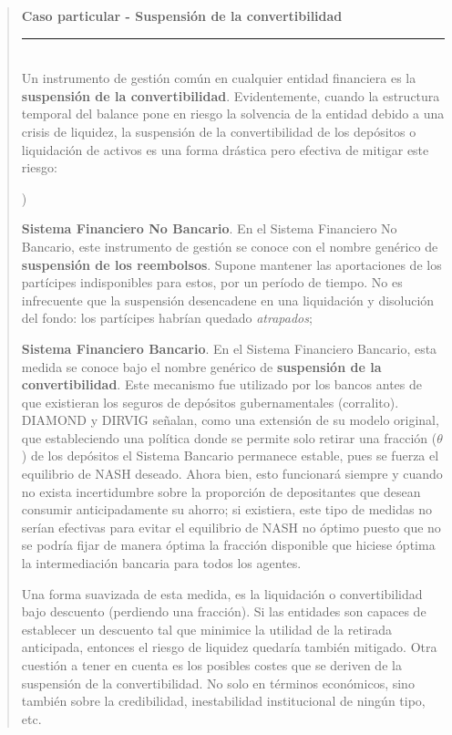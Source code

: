 \documentclass[10pt,a4paper]{article}
\newcounter{alphaitem}
\newenvironment{la}
      {\begin{list}{\alph{alphaitem})}{%
          \usecounter{alphaitem}%
          \setlength{\leftmargin}{1cm}%
          \setlength{\parskip}{3pt}%
          \setlength{\itemsep}{0pt}%
          \setlength{\parsep}{0pt}%
      }}
      {\end{list}}
\newenvironment{specialblock}[1]{%
      \begin{quote} %
      \small %
      \noindent\textbf{#1}\\[-0.3em] %
      \rule{\linewidth}{0.4pt}\\[0.6em]}{
      \end{quote}}
\begin{document}
\begin{specialblock}{Caso particular - Suspensión de la convertibilidad}
    Un instrumento de gestión común en cualquier entidad financiera es la \textbf{suspensión de la convertibilidad}. Evidentemente, cuando la estructura temporal del balance pone en riesgo la solvencia de la entidad debido a una crisis de liquidez, la suspensión de la convertibilidad de los depósitos o liquidación de activos es una forma drástica pero efectiva de mitigar este riesgo:
    \begin{la}
        \item \textbf{Sistema Financiero No Bancario}. En el Sistema Financiero No Bancario, este instrumento de gestión se conoce con el nombre genérico de \textbf{suspensión de los reembolsos}. Supone mantener las aportaciones de los partícipes indisponibles para estos, por un período de tiempo. No es infrecuente que la suspensión desencadene en una liquidación y disolución del fondo: los partícipes habrían quedado \textit{atrapados};
        \item \textbf{Sistema Financiero Bancario}. En el Sistema Financiero Bancario, esta medida se conoce bajo el nombre genérico de \textbf{suspensión de la convertibilidad}. Este mecanismo fue utilizado por los bancos antes de que existieran los seguros de depósitos gubernamentales (corralito). DIAMOND y DIRVIG señalan, como una extensión de su modelo original, que estableciendo una política donde se permite solo retirar una fracción ($\theta$) de los depósitos el Sistema Bancario permanece estable, pues se fuerza el equilibrio de NASH deseado. Ahora bien, esto funcionará siempre y cuando no exista incertidumbre sobre la proporción de depositantes que desean consumir anticipadamente su ahorro; si existiera, este tipo de medidas no serían efectivas para evitar el equilibrio de NASH no óptimo puesto que no se podría fijar de manera óptima la fracción disponible que hiciese óptima la intermediación bancaria para todos los agentes. 
    \end{la}

    Una forma suavizada de esta medida, es la liquidación o convertibilidad bajo descuento (perdiendo una fracción). Si las entidades son capaces de establecer un descuento tal que minimice la utilidad de la retirada anticipada, entonces el riesgo de liquidez quedaría también mitigado. Otra cuestión a tener en cuenta es los posibles costes que se deriven de la suspensión de la convertibilidad. No solo en términos económicos, sino también sobre la credibilidad, inestabilidad institucional de ningún tipo, etc. 
\end{specialblock}
\end{document}
